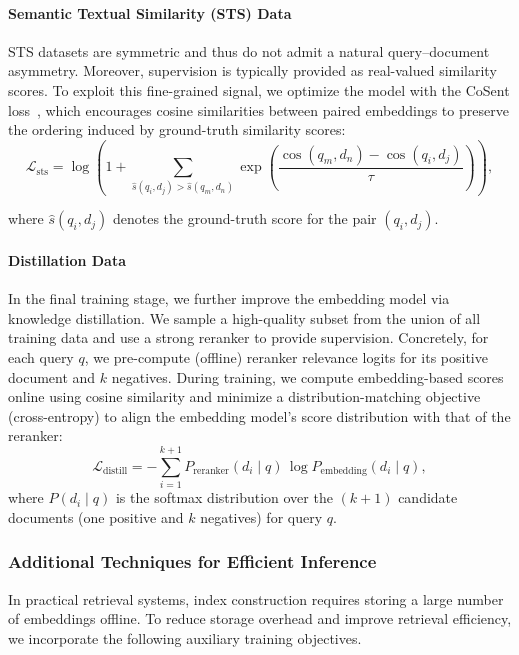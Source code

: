 \documentclass{article} %
\begin{document}
\paragraph{Semantic Textual Similarity (STS) Data} STS datasets are symmetric and thus do not admit a natural query--document asymmetry. Moreover, supervision is typically provided as real-valued similarity scores. To exploit this fine-grained signal, we optimize the model with the CoSent loss~\citep{10.1109/TASLP.2024.3402087}, which encourages cosine similarities between paired embeddings to preserve the ordering induced by ground-truth similarity scores:
\begin{equation}
\label{cosent}
\mathcal{L}_{\mathrm{sts}}
=
\log\!\left(
1 + \sum_{\hat{s}(q_i,d_j) > \hat{s}(q_m,d_n)}
\exp\!\left(
\frac{\cos(q_m,d_n) - \cos(q_i,d_j)}{\tau}
\right)
\right),
\end{equation}

where $\hat{s}(q_i, d_j)$ denotes the ground-truth score for the pair $(q_i, d_j)$.

\paragraph{Distillation Data}
In the final training stage, we further improve the embedding model via knowledge distillation. We sample a high-quality subset from the union of all training data and use a strong reranker to provide supervision. Concretely, for each query $q$, we pre-compute (offline) reranker relevance logits for its positive document and $k$ negatives. During training, we compute embedding-based scores online using cosine similarity and minimize a distribution-matching objective (cross-entropy) to align the embedding model's score distribution with that of the reranker:
\begin{equation}\label{loss:distillation}
\mathcal{L}_{\text{distill}}
=
-\sum_{i=1}^{k+1} P_{\text{reranker}}(d_i \mid q)\,
\log P_{\text{embedding}}(d_i \mid q),
\end{equation}
where $P(d_i \mid q)$ is the softmax distribution over the $(k{+}1)$ candidate documents (one positive and $k$ negatives) for query $q$.


\subsubsection{Additional Techniques for Efficient Inference}
In practical retrieval systems, index construction requires storing a large number of embeddings offline. To reduce storage overhead and improve retrieval efficiency, we incorporate the following auxiliary training objectives.
\end{document}
